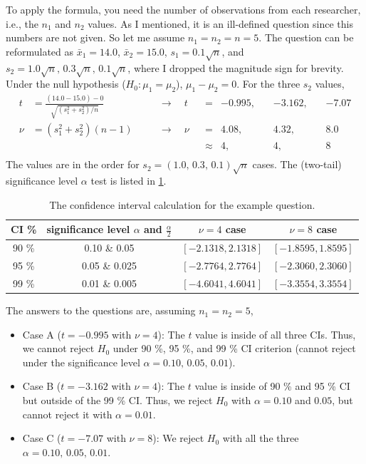 To apply the formula, you need the number of observations from each researcher, i.e., the $ n_1 $ and $ n_2 $ values. As I mentioned, it is an ill-defined question since this numbers are not given. So let me assume $ n_1 = n_2 = n = 5 $. The question can be reformulated as $ \bar{x}_1 = 14.0 $, $ \bar{x}_2 = 15.0 $, $ s_1 = 0.1 \sqrt{n} $, and $ s_2 = 1.0\sqrt{n},\, 0.3\sqrt{n}, \, 0.1\sqrt{n} $, where I dropped the magnitude sign for brevity. Under the null hypothesis ($ H_0: \mu_1 = \mu_2 $), $ \mu_1 - \mu_2 = 0 $. For the three $ s_2 $ values, 
\begin{equation}
\begin{aligned}
  t &= \frac{(14.0 - 15.0) - 0}{\sqrt{(s_1^2 + s_2^2) / n}}
  \quad &&\rightarrow \quad
  t &&= & -0.995 ,\, && -3.162 ,\, && -7.07 \\
  \nu &= (s_1^2 + s_2^2) (n-1)
  \quad &&\rightarrow \quad
  \nu &&= & 4.08, \, && 4.32, \, && 8.0 \\
  &&&&&\approx & 4 ,\, && 4 ,\, && 8 \\
\end{aligned}
\end{equation}
The values are in the order for $ s_2 = (1.0,\, 0.3, \, 0.1)\sqrt{n} $ cases. The (two-tail) significance level $ \alpha $ test is listed in \cref{tab: CI}.

\begin{table}[ht!]
\centering
\caption{The confidence interval calculation for the example question.}
\label{tab: CI}
\begin{tabular}{c|c||c|c}
CI \% & significance level $ \alpha $ and $ \frac{\alpha}{2} $& $ \nu = 4 $ case & $ \nu = 8 $ case \\
\hline
90 \% & 0.10 \& 0.05   & $ [-2.1318, 2.1318] $ & $ [-1.8595, 1.8595] $ \\
95 \% & 0.05 \& 0.025  & $ [-2.7764, 2.7764] $ & $ [-2.3060, 2.3060] $ \\
99 \% & 0.01 \& 0.005  & $ [-4.6041, 4.6041] $ & $ [-3.3554, 3.3554] $ \\
\end{tabular}
\end{table}

The answers to the questions are, assuming $ n_1 = n_2 = 5 $,
\begin{itemize}
\item Case A ($ t = -0.995 $ with $ \nu = 4 $): The $ t $ value is inside of all three CIs. Thus, we cannot reject $ H_0 $ under 90 \%, 95 \%, and 99 \% CI criterion (cannot reject under the significance level $ \alpha = 0.10,\, 0.05,\, 0.01 $).
\item Case B ($ t = -3.162 $ with $ \nu = 4 $): The $ t $ value is inside of 90 \% and 95 \% CI but outside of the 99 \% CI. Thus, we reject $ H_0 $ with $ \alpha = 0.10 $ and $ 0.05 $, but cannot reject it with $ \alpha = 0.01 $.
\item Case C ($ t = -7.07 $ with $ \nu = 8 $): We reject $ H_0 $ with all the three $ \alpha = 0.10,\, 0.05,\, 0.01 $.
\end{itemize}
\vspace{\parskip}

